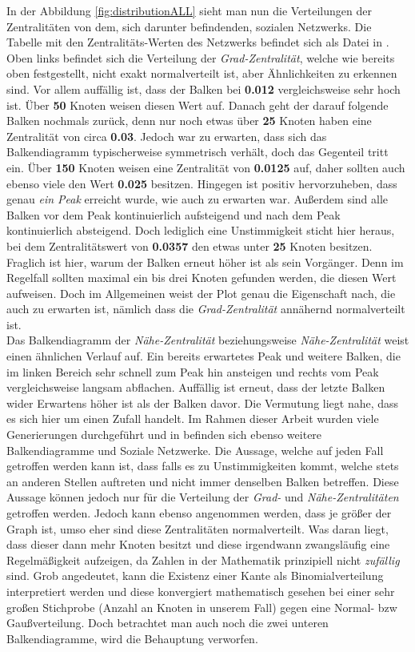 In der Abbildung \ref{fig:distributionALL} sieht man nun die Verteilungen der Zentralitäten von dem, sich darunter befindenden, sozialen Netzwerks. Die Tabelle mit den Zentralitäts-Werten des Netzwerks befindet sich als Datei in \cite{TZ}. Oben links befindet sich die Verteilung der \textit{Grad-Zentralität}, welche wie bereits oben festgestellt, nicht exakt normalverteilt ist, aber Ähnlichkeiten zu erkennen sind. Vor allem auffällig ist, dass der Balken bei \textbf{0.012} vergleichsweise sehr hoch ist. Über \textbf{50} Knoten weisen diesen Wert auf. Danach geht der darauf folgende Balken nochmals zurück, denn nur noch etwas über \textbf{25} Knoten haben eine Zentralität von circa \textbf{0.03}. Jedoch war zu erwarten, dass sich das Balkendiagramm typischerweise symmetrisch verhält, doch das Gegenteil tritt ein. Über \textbf{150} Knoten weisen eine Zentralität von \textbf{0.0125} auf, daher sollten auch ebenso viele den Wert \textbf{0.025} besitzen. Hingegen ist positiv hervorzuheben, dass genau \textit{ein Peak} erreicht wurde, wie auch zu erwarten war. Außerdem sind alle Balken vor dem Peak kontinuierlich aufsteigend und nach dem Peak kontinuierlich absteigend. Doch lediglich eine Unstimmigkeit sticht hier heraus, bei dem Zentralitätswert von \textbf{0.0357} den etwas unter \textbf{25} Knoten besitzen. Fraglich ist hier, warum der Balken erneut höher ist als sein Vorgänger. Denn im Regelfall sollten maximal ein bis drei Knoten gefunden werden, die diesen Wert aufweisen. Doch im Allgemeinen weist der Plot genau die Eigenschaft nach, die auch zu erwarten ist, nämlich dass die \textit{Grad-Zentralität} annähernd normalverteilt ist.\\

Das Balkendiagramm der \textit{Nähe-Zentralität} beziehungsweise \textit{Nähe-Zentralität} weist einen ähnlichen Verlauf auf. Ein bereits erwartetes Peak und weitere Balken, die im linken Bereich sehr schnell zum Peak hin ansteigen und rechts vom Peak vergleichsweise langsam abflachen. Auffällig ist erneut, dass der letzte Balken wider Erwartens höher ist als der Balken davor. Die Vermutung liegt nahe, dass es sich hier um einen Zufall handelt. Im Rahmen dieser Arbeit wurden viele Generierungen durchgeführt und in \cite{TZ} befinden sich ebenso weitere Balkendiagramme und Soziale Netzwerke. Die Aussage, welche auf jeden Fall getroffen werden kann ist, dass falls es zu Unstimmigkeiten kommt, welche stets an anderen Stellen auftreten und nicht immer denselben Balken betreffen. Diese Aussage können jedoch nur für die Verteilung der \textit{Grad-} und \textit{Nähe-Zentralitäten} getroffen werden. Jedoch kann ebenso angenommen werden, dass je größer der Graph ist, umso eher sind diese Zentralitäten normalverteilt. Was daran liegt, dass dieser dann mehr Knoten besitzt und diese irgendwann zwangsläufig eine Regelmäßigkeit aufzeigen, da Zahlen in der Mathematik prinzipiell nicht \textit{zufällig} sind. Grob angedeutet, kann die Existenz einer Kante als Binomialverteilung interpretiert werden und diese konvergiert mathematisch gesehen bei einer sehr großen Stichprobe (Anzahl an Knoten in unserem Fall) gegen eine Normal- bzw Gaußverteilung.
Doch betrachtet man auch noch die zwei unteren Balkendiagramme, wird die Behauptung verworfen. \\

